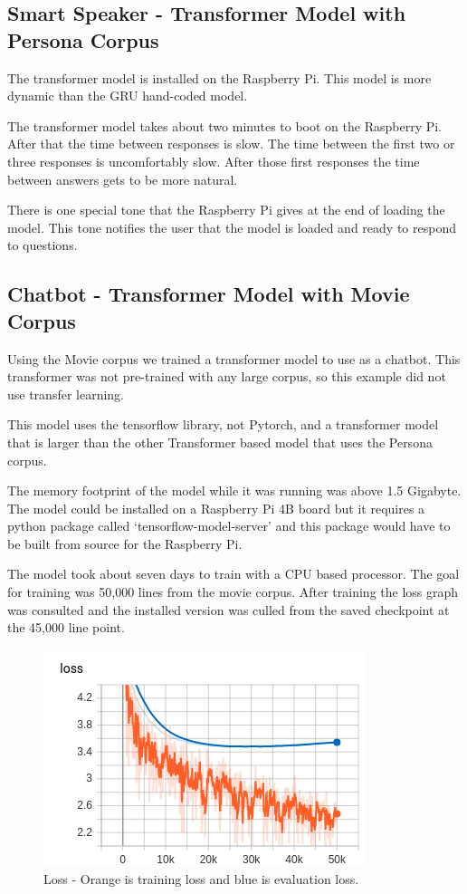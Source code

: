\subsection{Smart Speaker - Transformer Model with Persona Corpus}

The transformer model is installed on the Raspberry Pi. This model is more dynamic than the GRU hand-coded model. 

The transformer model takes about two minutes to boot on the Raspberry Pi. After that the time between responses is slow. The time between the first two or three responses is uncomfortably slow. After those first responses the time between answers gets to be more natural.

There is one special tone that the Raspberry Pi gives at the end of loading the model. This tone notifies the user that the model is loaded and ready to respond to questions.


\subsection{Chatbot - Transformer Model with Movie Corpus}
Using the Movie corpus we trained a transformer model to use as a chatbot. This transformer was not pre-trained with any large corpus, so this example did not use transfer learning. 

This model uses the tensorflow library, not Pytorch, and a transformer model that is larger than the other Transformer based model that uses the Persona corpus.

The memory footprint of the model while it was running was above 1.5 Gigabyte. The model could be installed on a Raspberry Pi 4B board but it requires a python package called `tensorflow-model-server' and this package would have to be built from source for the Raspberry Pi. 

The model took about seven days to train with a CPU based processor. The goal for training was 50,000 lines from the movie corpus. After training the loss graph was consulted and the installed version was culled from the saved checkpoint at the 45,000 line point.


\begin{figure}[H]
	\begin{center}
		\includegraphics[scale=3.5]{Figure_2}
		
		
	\end{center}
	\caption[Loss - Larger Transformer Model]{Loss - Orange is training loss and blue is evaluation loss.}
	
\end{figure}

